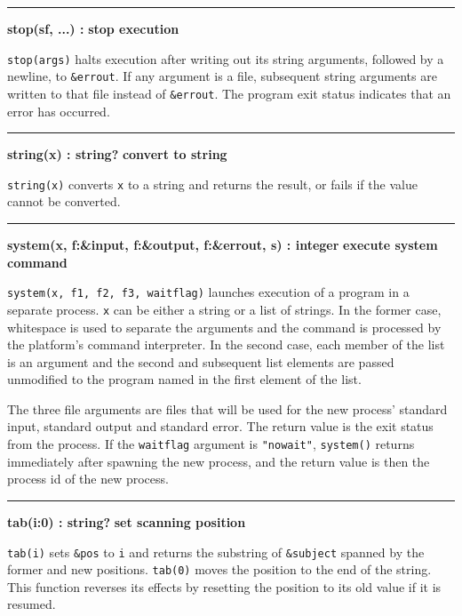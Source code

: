 \bigskip\hrule\vspace{0.1cm}
\noindent
{\bf stop(s{\textbar}f, ...) : } \hfill {\bf stop execution}

\noindent
{}\texttt{stop(args)} halts execution after
writing out its string arguments, followed by a newline, to
\texttt{\&errout}. If any argument is a file, subsequent string
arguments are written to that file instead of \texttt{\&errout}. The
program exit status indicates that an error has occurred.

\bigskip\hrule\vspace{0.1cm}
\noindent
{\bf string(x) : string? } \hfill {\bf convert to string}

\noindent
{}\texttt{string(x)} converts
\texttt{x} to a string and returns the result, or fails if the value
cannot be converted.

\bigskip\hrule\vspace{0.1cm}
\noindent
{\bf system(x, f:\&input, f:\&output, f:\&errout, s) : integer } \hfill {\bf execute system command}

\noindent
{}\texttt{system(x, f1, f2, f3, waitflag)} launches
execution of a program in a separate process. \texttt{x} can be either
a string or a list of strings. In the former case, whitespace is used
to separate the arguments and the command is processed by the
platform's command interpreter. In the second case,
each member of the list is an argument and the second and subsequent
list elements are passed unmodified to the program named in the first
element of the list.

The three file arguments are files that will be used for the new
process' standard input, standard output and standard
error. The return value is the exit status from the process. If the
\texttt{waitflag} argument is
\texttt{"nowait"}, \texttt{system()}
returns immediately after spawning the new process, and the return
value is then the process id of the new process.

\bigskip\hrule\vspace{0.1cm}
\noindent
{\bf tab(i:0) : string? } \hfill {\bf set scanning position}

\noindent
{}\texttt{tab(i)} sets \texttt{\&pos} to \texttt{i} and
returns the substring of \texttt{\&subject} spanned by the former and
new positions. \texttt{tab(0)} moves the position to the end of the
string. This function reverses its effects by resetting the position to
its old value if it is resumed.

